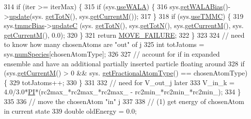 \begin{DoxyCode}
314                     \textcolor{keywordflow}{if} (iter >= iterMax) \{
315                         \textcolor{keywordflow}{if} (sys.\hyperlink{classsim_system_aa83b00006b3919fb6e13f1bdeadece6a}{useWALA}) \{
316                                 sys.\hyperlink{classsim_system_a7cb5049de8b0988349e89e30e4000407}{getWALABias}()->\hyperlink{classwala_ab439e3f60bea6c54522a870b9ad67acf}{update}(sys.
      \hyperlink{classsim_system_a37dd827f4057049763351510147b9f1d}{getTotN}(), sys.\hyperlink{classsim_system_a299fe4372e610b554eaaf5f5957b2dbc}{getCurrentM}());
317                         \}
318                         \textcolor{keywordflow}{if} (sys.\hyperlink{classsim_system_aa474a50b6353c8897331b1ab1ce53ab1}{useTMMC}) \{
319                                 sys.\hyperlink{classsim_system_a13173f45a1e40a5f5a3552b0ebe15b54}{tmmcBias}->\hyperlink{classtmmc_ae067afc5b52af203b9d45f18d9737219}{updateC} (sys.
      \hyperlink{classsim_system_a37dd827f4057049763351510147b9f1d}{getTotN}(), sys.\hyperlink{classsim_system_a37dd827f4057049763351510147b9f1d}{getTotN}(), sys.\hyperlink{classsim_system_a299fe4372e610b554eaaf5f5957b2dbc}{getCurrentM}(), sys.
      \hyperlink{classsim_system_a299fe4372e610b554eaaf5f5957b2dbc}{getCurrentM}(), 0.0);
320                         \}
321                         \textcolor{keywordflow}{return} \hyperlink{moves_8h_a9832cf5fcfa8c0894545b591c9908e39}{MOVE\_FAILURE};
322                     \}
323 
324             \textcolor{comment}{// need to know how many chosenAtoms are "out" of j}
325             \textcolor{keywordtype}{int} totJatoms = sys.\hyperlink{classsim_system_a9eea865e6dc1cff377b1e79c4d9c23f0}{numSpecies}[chosenAtomType];
326 
327                 \textcolor{comment}{// account for if in expanded ensemble and have an additional partially inserted particle
       floating around}
328                 \textcolor{keywordflow}{if} (sys.\hyperlink{classsim_system_a299fe4372e610b554eaaf5f5957b2dbc}{getCurrentM}() > 0 && sys.
      \hyperlink{classsim_system_a0500a9e84eecfbde7a98cf8a34f719d5}{getFractionalAtomType}() == chosenAtomType) \{
329                         totJatoms++;
330                 \}
331 
332             \textcolor{comment}{// need for V\_out\_j later}
333             V\_in\_k = 4.0/3.0*\hyperlink{global_8h_a598a3330b3c21701223ee0ca14316eca}{PI}*(rc2max\_*rc2max\_*rc2max\_ - rc2min\_*rc2min\_*rc2min\_);
334             \}
335 
336             \textcolor{comment}{// move the chosenAtom "in" j}
337 
338             \textcolor{comment}{// (1) get energy of chosenAtom in current state}
339             \textcolor{keywordtype}{double} oldEnergy = 0.0;

\end{DoxyCode}
